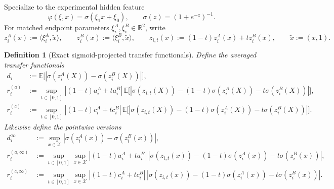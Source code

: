 \documentclass[11pt]{article}
\newtheorem{definition}{Definition}
\newcommand{\R}{\mathbb{R}}
\newcommand{\E}{\mathbb{E}}
\newcommand{\abs}[1]{\left\lvert #1 \right\rvert}
\begin{document}
Specialize to the experimental hidden feature
\[
  \varphi(\xi,x)=\sigma(\xi_1x+\xi_0),
  \qquad
  \sigma(z)=(1+e^{-z})^{-1}.
\]
For matched endpoint parameters $\xi_i^A,\xi_i^B\in\R^2$, write
\[
  z_i^A(x):=\langle \xi_i^A,\tilde x\rangle,
  \qquad
  z_i^B(x):=\langle \xi_i^B,\tilde x\rangle,
  \qquad
  z_{i,t}(x):=(1-t)z_i^A(x)+t z_i^B(x),
  \qquad
  \tilde x:=(x,1).
\]

\begin{definition}[Exact sigmoid-projected transfer functionals]
\label{def:exact-sigmoid-projected}
Define the averaged transfer functionals
\begin{align}
  d_i
  &:=
  \E\big[\abs{\sigma(z_i^A(X))-\sigma(z_i^B(X))}\big],
  \label{eq:exact-di}
  \\
  r_i^{(a)}
  &:=
  \sup_{t\in[0,1]}
  \abs{(1-t)a_i^A+t a_i^B}\,
  \E\big[
    \abs{\sigma(z_{i,t}(X))-(1-t)\sigma(z_i^A(X))-t\sigma(z_i^B(X))}
  \big],
  \label{eq:exact-ra}
  \\
  r_i^{(c)}
  &:=
  \sup_{t\in[0,1]}
  \abs{(1-t)c_i^A+t c_i^B}\,
  \E\big[
    \abs{\sigma(z_{i,t}(X))-(1-t)\sigma(z_i^A(X))-t\sigma(z_i^B(X))}
  \big].
  \label{eq:exact-rc}
\end{align}
Likewise define the pointwise versions
\begin{align}
  d_i^\infty
  &:=
  \sup_{x\in\mathcal X}
  \abs{\sigma(z_i^A(x))-\sigma(z_i^B(x))},
  \label{eq:exact-di-inf}
  \\
  r_i^{(a,\infty)}
  &:=
  \sup_{t\in[0,1]}\sup_{x\in\mathcal X}
  \abs{(1-t)a_i^A+t a_i^B}\,
  \abs{\sigma(z_{i,t}(x))-(1-t)\sigma(z_i^A(x))-t\sigma(z_i^B(x))},
  \label{eq:exact-ra-inf}
  \\
  r_i^{(c,\infty)}
  &:=
  \sup_{t\in[0,1]}\sup_{x\in\mathcal X}
  \abs{(1-t)c_i^A+t c_i^B}\,
  \abs{\sigma(z_{i,t}(x))-(1-t)\sigma(z_i^A(x))-t\sigma(z_i^B(x))}.
  \label{eq:exact-rc-inf}
\end{align}
\end{definition}
\end{document}

